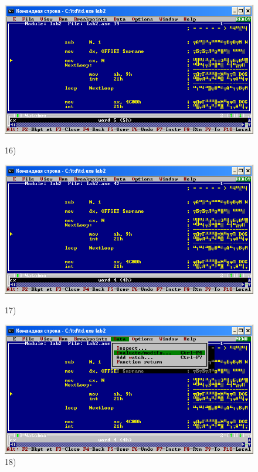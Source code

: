 \begin{figure}[!htp]
    \centering
    \begin{minipage}{0.32\textwidth}
        \centering
        \includegraphics[width=.99\linewidth]
            {../_INCLUDES/task-4-14/16.png}
        \caption{16) }
        \label{fig:task_4_14__16}
    \end{minipage}
    \begin {minipage}{0.32\textwidth}
        \centering
        \includegraphics[width=.99\linewidth]
            {../_INCLUDES/task-4-14/17.png}
        \caption{17) }
        \label{fig:task_4_14__17}
    \end{minipage}
    \begin {minipage}{0.32\textwidth}
        \centering
        \includegraphics[width=.99\linewidth]
            {../_INCLUDES/task-4-14/18.png}
        \caption{18) }
        \label{fig:task_4_14__18}
    \end{minipage}
\end{figure}

